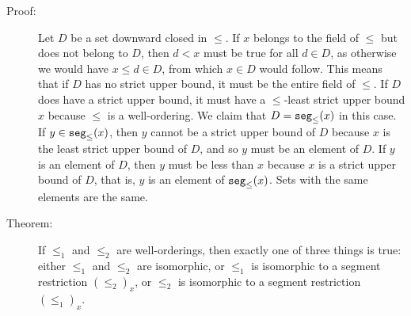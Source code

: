 \documentclass[12pt]{book}
\begin{document}
\begin{description}
\item[Proof:] Let $D$ be a set downward closed in $\leq$.  If $x$
belongs to the field of $\leq$ but does not belong to $D$, then $d <
x$ must be true for all $d \in D$, as otherwise we would have $x \leq
d \in D$, from which $x \in D$ would follow.  This means that if $D$
has no strict upper bound, it must be the entire field of $\leq$.  If
$D$ does have a strict upper bound, it must have a $\leq$-least strict
upper bound $x$ because $\leq$ is a well-ordering.  We claim that $D =
{\tt seg}_{\leq}(x)$ in this case.  If $y \in {\tt seg}_{\leq}(x)$,
then $y$ cannot be a strict upper bound of $D$ because $x$ is the
least strict upper bound of $D$, and so $y$ must be an element of $D$.
If $y$ is an element of $D$, then $y$ must be less than $x$ because
$x$ is a strict upper bound of $D$, that is, $y$ is an element of
${\tt seg}_{\leq}(x)$.  Sets with the same elements are the same.


\item[Theorem:] If $\leq_1$ and $\leq_2$ are well-orderings, then
exactly one of three things is true: either $\leq_1$ and $\leq_2$ are
isomorphic, or $\leq_1$ is isomorphic to a segment restriction
$(\leq_2)_x$, or $\leq_2$ is isomorphic to a segment restriction
$(\leq_1)_x$.


\end{description}
\end{document}
